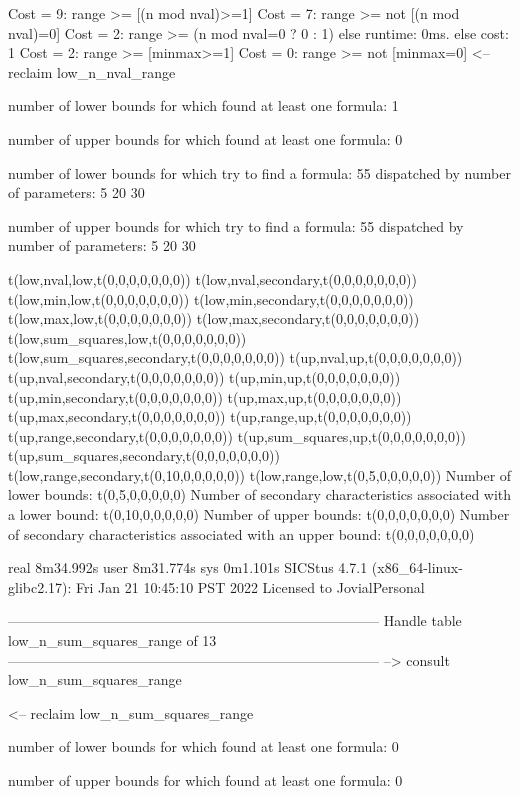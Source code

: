 Cost =  9:  range >= [(n mod nval)>=1]
Cost =  7:  range >= not [(n mod nval)=0]
Cost =  2:  range >= (n mod nval=0 ? 0 : 1)
else runtime: 0ms. else cost: 1
Cost =  2:  range >= [minmax>=1]
Cost =  0:  range >= not [minmax=0]
<-- reclaim low_n_nval_range

number of lower bounds for which found at least one formula: 1

number of upper bounds for which found at least one formula: 0

number of lower bounds for which try to find a formula: 55
dispatched by number of parameters: 5  20  30

number of upper bounds for which try to find a formula: 55
dispatched by number of parameters: 5  20  30

t(low,nval,low,t(0,0,0,0,0,0,0))
t(low,nval,secondary,t(0,0,0,0,0,0,0))
t(low,min,low,t(0,0,0,0,0,0,0))
t(low,min,secondary,t(0,0,0,0,0,0,0))
t(low,max,low,t(0,0,0,0,0,0,0))
t(low,max,secondary,t(0,0,0,0,0,0,0))
t(low,sum_squares,low,t(0,0,0,0,0,0,0))
t(low,sum_squares,secondary,t(0,0,0,0,0,0,0))
t(up,nval,up,t(0,0,0,0,0,0,0))
t(up,nval,secondary,t(0,0,0,0,0,0,0))
t(up,min,up,t(0,0,0,0,0,0,0))
t(up,min,secondary,t(0,0,0,0,0,0,0))
t(up,max,up,t(0,0,0,0,0,0,0))
t(up,max,secondary,t(0,0,0,0,0,0,0))
t(up,range,up,t(0,0,0,0,0,0,0))
t(up,range,secondary,t(0,0,0,0,0,0,0))
t(up,sum_squares,up,t(0,0,0,0,0,0,0))
t(up,sum_squares,secondary,t(0,0,0,0,0,0,0))
t(low,range,secondary,t(0,10,0,0,0,0,0))
t(low,range,low,t(0,5,0,0,0,0,0))
Number of lower bounds:                                             t(0,5,0,0,0,0,0)
Number of secondary characteristics associated with a lower bound:  t(0,10,0,0,0,0,0)
Number of upper bounds:                                             t(0,0,0,0,0,0,0)
Number of secondary characteristics associated with an upper bound: t(0,0,0,0,0,0,0)

real	8m34.992s
user	8m31.774s
sys	0m1.101s
SICStus 4.7.1 (x86_64-linux-glibc2.17): Fri Jan 21 10:45:10 PST 2022
Licensed to JovialPersonal


--------------------------------------------------------------------------------
Handle table low_n_sum_squares_range of 13
--------------------------------------------------------------------------------
--> consult low_n_sum_squares_range

<-- reclaim low_n_sum_squares_range

number of lower bounds for which found at least one formula: 0

number of upper bounds for which found at least one formula: 0

